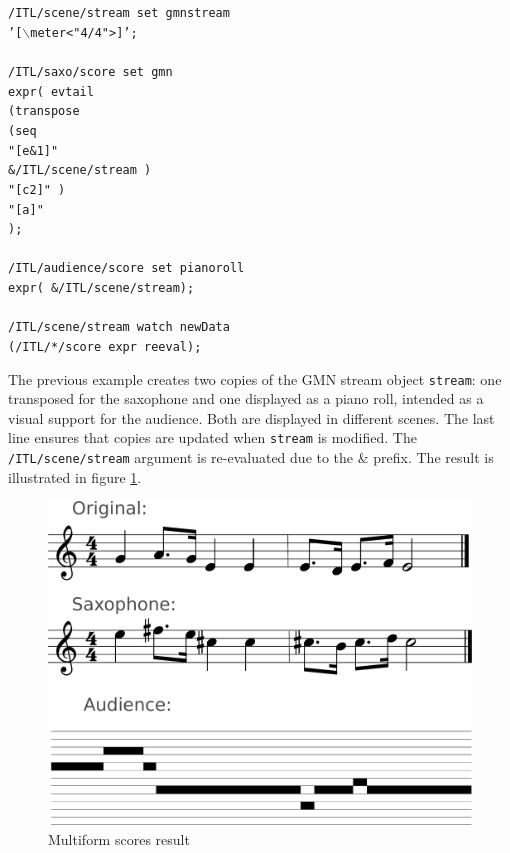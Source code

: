 \documentclass{article}
\newcommand{\OSC}[1]{{\fontsize{9.5pt}{10pt} \selectfont\texttt{#1}}}
\newcommand{\tab}{\hspace*{4mm}}
\newcommand{\sample}	[1]			{\vspace{-0.2em}\begin{center}\colorbox{mygrey}{\begin{minipage}[t]{0.95\columnwidth} {\small \texttt{#1}}\end{minipage}}\end{center}}
\begin{document}
{\sample{/ITL/scene/stream set gmnstream \\
\tab '[$\backslash$meter<"4/4">]';\\
\\
/ITL/saxo/score set gmn \\
\tab expr( evtail\\
\tab \tab (transpose\\
\tab \tab \tab (seq\\
\tab \tab \tab \tab "[e\&1]"\\
\tab \tab \tab \tab \&/ITL/scene/stream )\\
\tab \tab \tab "[c2]" )\\
\tab \tab "[a]"\\
\tab );\\
\\
/ITL/audience/score set pianoroll \\
\tab expr( \&/ITL/scene/stream);\\
\\
/ITL/scene/stream watch newData\\
\tab(/ITL/*/score expr reeval);
}

The previous example creates two copies of the GMN stream object \OSC{stream}: one transposed for the saxophone and one displayed as a piano roll, intended as a visual support for the audience. Both are displayed in different scenes.
The last line ensures that copies are updated when \OSC{stream} is modified. The \OSC{/ITL/scene/stream} argument is re-evaluated due to the \& prefix. The result is illustrated in figure \ref{fig:mutliscoreFig}.

\begin{figure}[th]
\centering
\includegraphics[width=0.9\columnwidth]{imgs/example1}
\caption{Multiform scores result
\label{fig:mutliscoreFig}}
\end{figure}


}
\end{document}
